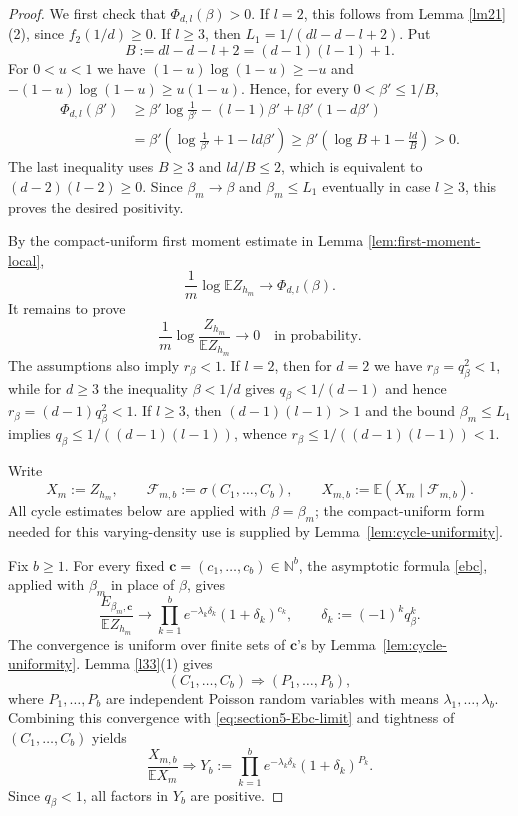 \documentclass[11pt]{amsart}
\theoremstyle{plain}
\numberwithin{equation}{section}
\numberwithin{theorem}{section}
\numberwithin{figure}{section}
\begin{document}
\begin{proof}
We first check that $\Phi_{d,l}(\beta)>0$.  If $l=2$, this follows from
Lemma \ref{lm21}(2), since $f_2(1/d)\ge0$.  If $l\ge3$, then
$L_1=1/(dl-d-l+2)$.  Put
\[
B:=dl-d-l+2=(d-1)(l-1)+1.
\]
For $0<u<1$ we have $(1-u)\log(1-u)\ge -u$ and
$-(1-u)\log(1-u)\ge u(1-u)$.  Hence, for every $0<\beta'\le 1/B$,
\begin{align*}
\Phi_{d,l}(\beta')
&\ge \beta'\log\frac1{\beta'}-(l-1)\beta'
   +l\beta'(1-d\beta') \\
&=\beta'\left(\log\frac1{\beta'}+1-ld\beta'\right)
\ge \beta'\left(\log B+1-\frac{ld}{B}\right)>0.
\end{align*}
The last inequality uses $B\ge3$ and $ld/B\le2$, which is equivalent to
$(d-2)(l-2)\ge0$.  Since $\beta_m\to\beta$ and $\beta_m\le L_1$ eventually in
case $l\ge3$, this proves the desired positivity.

By the compact-uniform first moment estimate in Lemma \ref{lem:first-moment-local},
\begin{equation}\label{eq:section5-first-moment-log}
  \frac1m\log \mathbb E Z_{h_m}\longrightarrow \Phi_{d,l}(\beta).
\end{equation}
It remains to prove
\begin{equation}\label{lmb}
  \frac1m\log\frac{Z_{h_m}}{\mathbb E Z_{h_m}}\longrightarrow0
  \quad\text{in probability}.
\end{equation}
The assumptions also imply $r_\beta<1$.  If $l=2$, then for $d=2$ we have
$r_\beta=q_\beta^2<1$, while for $d\ge3$ the inequality $\beta<1/d$ gives
$q_\beta<1/(d-1)$ and hence $r_\beta=(d-1)q_\beta^2<1$.  If $l\ge3$, then
$(d-1)(l-1)>1$ and the bound $\beta_m\le L_1$ implies
$q_\beta\le 1/((d-1)(l-1))$, whence
$r_\beta\le 1/((d-1)(l-1))<1$.

Write
\[
  X_m:=Z_{h_m},\qquad \mathcal F_{m,b}:=\sigma(C_1,\ldots,C_b),\qquad
  X_{m,b}:=\mathbb E(X_m\mid\mathcal F_{m,b}).
\]
All cycle estimates below are applied with $\beta=\beta_m$; the compact-uniform
form needed for this varying-density use is supplied by Lemma~\ref{lem:cycle-uniformity}.

Fix $b\ge1$.  For every fixed $\mathbf c=(c_1,\ldots,c_b)\in\mathbb N^b$, the
asymptotic formula \eqref{ebc}, applied with $\beta_m$ in place of $\beta$, gives
\begin{equation}\label{eq:section5-Ebc-limit}
  \frac{E_{\beta_m,\mathbf c}}{\mathbb E Z_{h_m}}
  \longrightarrow
  \prod_{k=1}^b e^{-\lambda_k\delta_k}(1+\delta_k)^{c_k},
  \qquad
  \delta_k:=(-1)^kq_\beta^k .
\end{equation}
The convergence is uniform over finite sets of $\mathbf c$'s by
Lemma~\ref{lem:cycle-uniformity}.  Lemma
\ref{l33}(1) gives
\[
  (C_1,\ldots,C_b)\Rightarrow (P_1,\ldots,P_b),
\]
where $P_1,\ldots,P_b$ are independent Poisson random variables with means
$\lambda_1,\ldots,\lambda_b$.  Combining this convergence with
\eqref{eq:section5-Ebc-limit} and tightness of $(C_1,\ldots,C_b)$ yields
\begin{equation}\label{eq:section5-Xmb-limit}
  \frac{X_{m,b}}{\mathbb E X_m}\Rightarrow
  Y_b:=\prod_{k=1}^b e^{-\lambda_k\delta_k}(1+\delta_k)^{P_k}.
\end{equation}
Since $q_\beta<1$, all factors in $Y_b$ are positive.


\end{proof}
\end{document}
